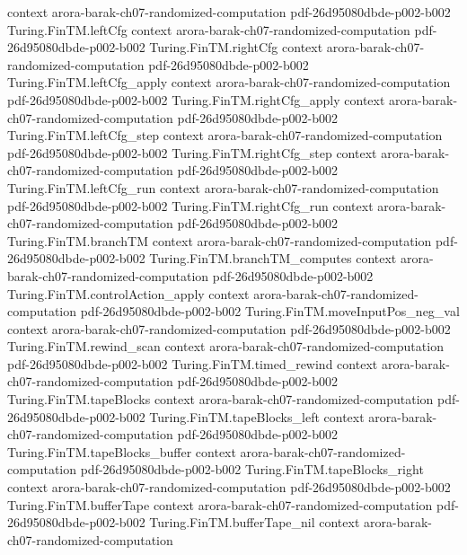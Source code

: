 \begin{theorem}
  {context}
  {arora-barak-ch07-randomized-computation}
  {pdf-26d95080dbde-p002-b002}
\proofstep
  {Turing.FinTM.leftCfg}
  {context}
  {arora-barak-ch07-randomized-computation}
  {pdf-26d95080dbde-p002-b002}
\proofstep
  {Turing.FinTM.rightCfg}
  {context}
  {arora-barak-ch07-randomized-computation}
  {pdf-26d95080dbde-p002-b002}
\proofstep
  {Turing.FinTM.leftCfg_apply}
  {context}
  {arora-barak-ch07-randomized-computation}
  {pdf-26d95080dbde-p002-b002}
\proofstep
  {Turing.FinTM.rightCfg_apply}
  {context}
  {arora-barak-ch07-randomized-computation}
  {pdf-26d95080dbde-p002-b002}
\proofstep
  {Turing.FinTM.leftCfg_step}
  {context}
  {arora-barak-ch07-randomized-computation}
  {pdf-26d95080dbde-p002-b002}
\proofstep
  {Turing.FinTM.rightCfg_step}
  {context}
  {arora-barak-ch07-randomized-computation}
  {pdf-26d95080dbde-p002-b002}
\proofstep
  {Turing.FinTM.leftCfg_run}
  {context}
  {arora-barak-ch07-randomized-computation}
  {pdf-26d95080dbde-p002-b002}
\proofstep
  {Turing.FinTM.rightCfg_run}
  {context}
  {arora-barak-ch07-randomized-computation}
  {pdf-26d95080dbde-p002-b002}
\proofstep
  {Turing.FinTM.branchTM}
  {context}
  {arora-barak-ch07-randomized-computation}
  {pdf-26d95080dbde-p002-b002}
\proofstep
  {Turing.FinTM.branchTM_computes}
  {context}
  {arora-barak-ch07-randomized-computation}
  {pdf-26d95080dbde-p002-b002}
\proofstep
  {Turing.FinTM.controlAction_apply}
  {context}
  {arora-barak-ch07-randomized-computation}
  {pdf-26d95080dbde-p002-b002}
\proofstep
  {Turing.FinTM.moveInputPos_neg_val}
  {context}
  {arora-barak-ch07-randomized-computation}
  {pdf-26d95080dbde-p002-b002}
\proofstep
  {Turing.FinTM.rewind_scan}
  {context}
  {arora-barak-ch07-randomized-computation}
  {pdf-26d95080dbde-p002-b002}
\proofstep
  {Turing.FinTM.timed_rewind}
  {context}
  {arora-barak-ch07-randomized-computation}
  {pdf-26d95080dbde-p002-b002}
\proofstep
  {Turing.FinTM.tapeBlocks}
  {context}
  {arora-barak-ch07-randomized-computation}
  {pdf-26d95080dbde-p002-b002}
\proofstep
  {Turing.FinTM.tapeBlocks_left}
  {context}
  {arora-barak-ch07-randomized-computation}
  {pdf-26d95080dbde-p002-b002}
\proofstep
  {Turing.FinTM.tapeBlocks_buffer}
  {context}
  {arora-barak-ch07-randomized-computation}
  {pdf-26d95080dbde-p002-b002}
\proofstep
  {Turing.FinTM.tapeBlocks_right}
  {context}
  {arora-barak-ch07-randomized-computation}
  {pdf-26d95080dbde-p002-b002}
\proofstep
  {Turing.FinTM.bufferTape}
  {context}
  {arora-barak-ch07-randomized-computation}
  {pdf-26d95080dbde-p002-b002}
\proofstep
  {Turing.FinTM.bufferTape_nil}
  {context}
  {arora-barak-ch07-randomized-computation}

\end{theorem}

